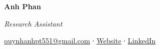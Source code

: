 \begin{huge}\begin{center}{\bf Anh Phan}\end{center}\end{huge}
\begin{large}\begin{center}\textit{Research Assistant}\end{center}\end{large}
\begin{center}\href{mailto::quynhanhpt551@gmail.com}{quynhanhpt551@gmail.com} ∙ \href{https://quingzz.github.io/}{Website} ∙ \href{https://linkedin.com/in/truong-quynh-anh-phan-219572212}{LinkedIn}
\end{center}
\vspace{5pt}